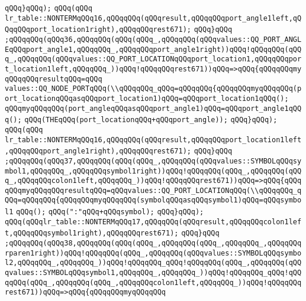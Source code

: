 \verb|qQQq}qQQq);|\newline
\verb|qQQq(qQQq|\newline
\verb|lr_table::NONTERMqQQq16,qQQqqQQq(qQQqresult,qQQqqQQqport_angle1left,qQQqqQQqport_location1right),qQQqqQQqrest671);|\newline
\verb|qQQq}qQQq|\newline
\verb|;qQQqqQQq(qQQq36,qQQqqQQq(qQQq(qQQq_,qQQqqQQq(qQQqvalues::QQ_PORT_ANGLEqQQqport_angle1,qQQqqQQq_,qQQqqQQqport_angle1right))qQQq!qQQqqQQq(qQQq_,qQQqqQQq(qQQqvalues::QQ_PORT_LOCATIONqQQqport_location1,qQQqqQQqport_location1left,qQQqqQQq_))qQQq!qQQqqQQqrest671))qQQq=>qQQq{qQQqqQQqmyqQQqqQQqresultqQQq=qQQq|\newline
\verb|values::QQ_NODE_PORTqQQq(\\qQQqqQQq_qQQq=qQQqqQQq{qQQqqQQqmyqQQqqQQq(port_locationqQQqasqQQqport_location1)qQQq=qQQqport_location1qQQq();|\newline
\verb|qQQqmyqQQqqQQq(port_angleqQQqasqQQqport_angle1)qQQq=qQQqport_angle1qQQq();|\newline
\verb|qQQq(THEqQQq(port_locationqQQq+qQQqport_angle));|\newline
\verb|qQQq}qQQq);|\newline
\verb|qQQq(qQQq|\newline
\verb|lr_table::NONTERMqQQq16,qQQqqQQq(qQQqresult,qQQqqQQqport_location1left,qQQqqQQqport_angle1right),qQQqqQQqrest671);|\newline
\verb|qQQq}qQQq|\newline
\verb|;qQQqqQQq(qQQq37,qQQqqQQq(qQQq(qQQq_,qQQqqQQq(qQQqvalues::SYMBOLqQQqsymbol1,qQQqqQQq_,qQQqqQQqsymbol1right))qQQq!qQQqqQQq(qQQq_,qQQqqQQq(qQQq_,qQQqqQQqcolon1left,qQQqqQQq_))qQQq!qQQqqQQqrest671))qQQq=>qQQq{qQQqqQQqmyqQQqqQQqresultqQQq=qQQqvalues::QQ_PORT_LOCATIONqQQq(\\qQQqqQQq_qQQq=qQQqqQQq{qQQqqQQqmyqQQqqQQq(symbolqQQqasqQQqsymbol1)qQQq=qQQqsymbol1|\newline
\verb|qQQq();|\newline
\verb|qQQq(":"qQQq+qQQqsymbol);|\newline
\verb|qQQq}qQQq);|\newline
\verb|qQQq(qQQqlr_table::NONTERMqQQq17,qQQqqQQq(qQQqresult,qQQqqQQqcolon1left,qQQqqQQqsymbol1right),qQQqqQQqrest671);|\newline
\verb|qQQq}qQQq|\newline
\verb|;qQQqqQQq(qQQq38,qQQqqQQq(qQQq(qQQq_,qQQqqQQq(qQQq_,qQQqqQQq_,qQQqqQQqrparen1right))qQQq!qQQqqQQq(qQQq_,qQQqqQQq(qQQqvalues::SYMBOLqQQqsymbol2,qQQqqQQq_,qQQqqQQq_))qQQq!qQQqqQQq_qQQq!qQQqqQQq(qQQq_,qQQqqQQq(qQQqvalues::SYMBOLqQQqsymbol1,qQQqqQQq_,qQQqqQQq_))qQQq!qQQqqQQq_qQQq!qQQqqQQq(qQQq_,qQQqqQQq(qQQq_,qQQqqQQqcolon1left,qQQqqQQq_))qQQq!qQQqqQQqrest671))qQQq=>qQQq{qQQqqQQqmyqQQqqQQq|\newline
